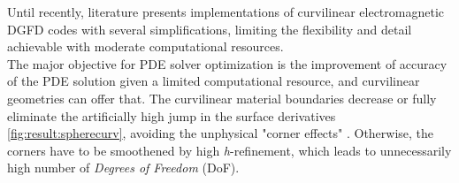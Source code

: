 \noindent
Until recently, literature presents implementations of curvilinear electromagnetic DGFD codes with several simplifications, limiting the flexibility and detail achievable with moderate computational resources. \\

\noindent
The major objective for PDE solver optimization is the improvement of accuracy of the PDE solution given a limited computational resource, and curvilinear geometries can offer that. The curvilinear material boundaries decrease or fully eliminate the artificially high jump in the surface derivatives \cref{fig:result:spherecurv}, avoiding the unphysical "corner effects" \cite{volakis1998, jin2014}. Otherwise, the corners have to be smoothened by high \textit{h}-refinement, which leads to unnecessarily high number of \textit{Degrees of Freedom} (DoF). \\

